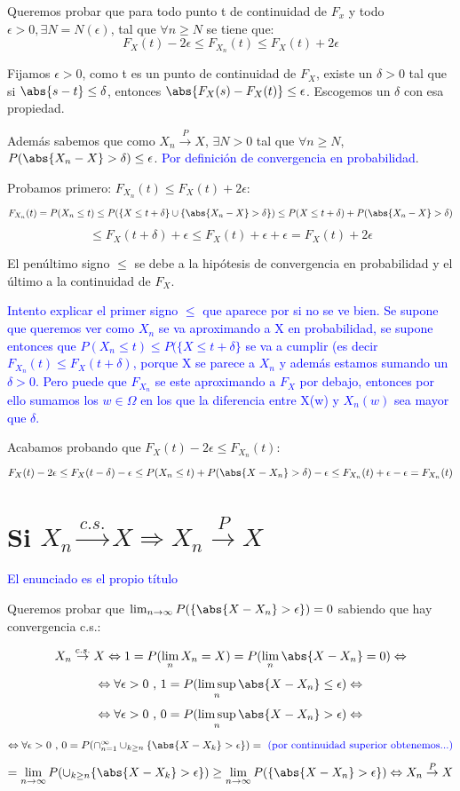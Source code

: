 \documentclass{apuntes}
\begin{document}
Queremos probar que para todo punto t de continuidad de $F_x$ y todo $\epsilon >0, \exists N=N(\epsilon)$, tal que $\forall n \geq N$ se tiene que:
\[
F_X(t)-2\epsilon \leq F_{X_n}(t) \leq F_X(t)+2\epsilon
\]

Fijamos $\epsilon>0$, como t es un punto de continuidad de $F_X$, existe un $\delta>0$ tal que si $\abs{s-t}\leq \delta$, entonces $\abs{F_X(s)-F_X(t)} \leq \epsilon$. Escogemos un $\delta$ con esa propiedad.

Además sabemos que como $X_n \stackrel{P}{\rightarrow} X$, $\exists N>0$ tal que $\forall n \geq N$, $P(\abs{X_n -X}>\delta)\leq \epsilon$. \textcolor{blue}{Por definición de convergencia en probabilidad}.

Probamos primero: $F_{X_n}(t) \leq F_X(t)+2\epsilon$:
\[
F_{X_n}(t) = P(X_n \leq t) \leq P(\{X \leq t+\delta\} \cup \{\abs{X_n -X} > \delta\}) \leq P(X \leq t+\delta)+ P(\abs{X_n -X} > \delta)
\]
\[
\leq F_X(t+\delta)+\epsilon \leq F_X(t)+\epsilon+\epsilon = F_{X}(t) + 2\epsilon
\]

El penúltimo signo $\leq$ se debe a la hipótesis de convergencia en probabilidad y el último a la continuidad de $F_X$.

\textcolor{blue}{Intento explicar el primer signo $\leq$ que aparece por si no se ve bien. Se supone que queremos ver como $X_n$ se va aproximando a X en probabilidad, se supone entonces que $P(X_n \leq t) \leq P(\{X \leq t+\delta\}$ se va a cumplir (es decir $F_{X_n}(t) \leq F_X(t+\delta)$, porque X se parece a $X_n$ y además estamos sumando un $\delta >0$. Pero puede que $F_{X_n}$ se este aproximando a $F_X$ por debajo, entonces por ello sumamos los $w \in \Omega$ en los que la diferencia entre X(w) y $X_n(w)$ sea mayor que $\delta$.}

Acabamos probando que $F_X(t)-2\epsilon \leq F_{X_n}(t)$:
\[
F_X(t)-2\epsilon \leq F_X(t-\delta)-\epsilon \leq P(X_n \leq t)+ P(\abs{X -X_n} > \delta) - \epsilon \leq F_{X_n}(t) + \epsilon - \epsilon  = F_{X_n}(t)
\]

\section{Si $X_n \stackrel{c.s.}{\rightarrow} X  \Rightarrow X_n \stackrel{P}{\rightarrow} X$}
\textcolor{blue}{El enunciado es el propio título}

Queremos probar que $ \lim_{n \rightarrow \infty} P(\{\abs{X-X_n} > \epsilon\})=0$ sabiendo que hay convergencia c.s.:

\[
X_n \stackrel{c.s.}{\rightarrow} X \Leftrightarrow 1=P(\lim_n X_n = X) = P(\lim_n \abs{X-X_n}=0)\Leftrightarrow
\]
\[
\Leftrightarrow \forall \epsilon >0 \text{ , } 1=P(\limsup_n \abs{X-X_n} \leq \epsilon) \Leftrightarrow
\]
\[
\Leftrightarrow \forall \epsilon >0 \text{ , } 0=P(\limsup_n \abs{X-X_n} > \epsilon) \Leftrightarrow
\]
\[
\Leftrightarrow \forall \epsilon >0 \text{ , } 0=P(\cap_{n=1}^{\infty} \cup_{k \geq n} \{\abs{X-X_k} > \epsilon\}) = \text{ \textcolor{blue}{(por continuidad superior obtenemos...)}}
\]
\[
= \lim_{n \rightarrow
\infty} P( \cup_{k \geq n} \{\abs{X-X_k} > \epsilon\}) \geq \lim_{n \rightarrow \infty} P(\{\abs{X-X_n} > \epsilon\})  \Leftrightarrow X_n \stackrel{P}{\rightarrow} X
\]
\end{document}
